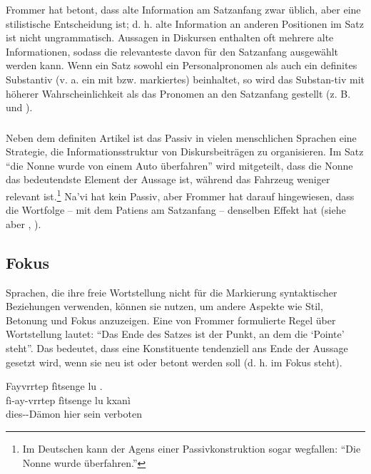 Frommer hat betont, dass alte Information am Satzanfang zwar üblich, aber eine stilistische Entscheidung ist; d. h. alte Information an anderen Positionen im Satz ist nicht ungrammatisch. Aussagen in Diskursen enthalten oft mehrere alte Informationen, sodass die relevanteste davon für den Satzanfang ausgewählt werden kann. Wenn ein Satz sowohl ein Personalpronomen als auch ein definites Substantiv (v. a. ein mit  bzw.  markiertes) beinhaltet, so wird das Substan-tiv mit höherer Wahrscheinlichkeit als das Pronomen an den Satzanfang gestellt (z. B.  und ). 

\subsubsection{} Neben dem definiten Artikel ist das Passiv in vielen menschlichen Sprachen eine Strategie, die Informationsstruktur von Diskursbeiträgen zu organisieren. Im Satz ``die Nonne wurde von einem Auto überfahren'' wird mitgeteilt, dass die Nonne das bedeutendste Element der Aussage ist, während das Fahrzeug weniger relevant ist.\footnote{Im Deutschen kann der Agens einer Passivkonstruktion sogar wegfallen: ``Die Nonne wurde überfahren.''} Na'vi hat kein Passiv, aber Frommer hat darauf hingewiesen, dass die Wortfolge  -- mit dem Patiens am Satzanfang -- denselben Effekt hat (siehe aber , ).

\subsection{Fokus} 
Sprachen, die ihre freie Wortstellung nicht für die Markierung syntaktischer Beziehungen verwenden, können sie nutzen, um andere Aspekte wie Stil, Betonung und Fokus anzuzeigen.
Eine von Frommer formulierte Regel über Wortstellung lautet: ``Das Ende des Satzes ist der Punkt, an dem die `Pointe' steht''. Das bedeutet, dass eine Konstituente tendenziell ans Ende der Aussage gesetzt wird, wenn sie neu ist oder betont werden soll (d. h. im Fokus steht).

\begin{interlin}
	\glll Fayvrrtep fìtsenge lu . \\
	fì-ay-vrrtep fìtsenge lu kxanì \\
	dies--Dämon hier sein verboten \\
\end{interlin}

